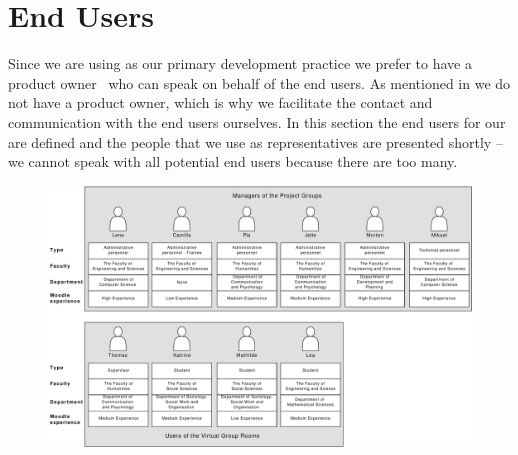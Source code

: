 \section{End Users}
\label{sec:enduser}
Since we are using \scrum{} as our primary development practice we prefer to have a product owner~\cite[p.~115]{Larman04} who can speak on behalf of the end users.
As mentioned in  we do not have a product owner, which is why we facilitate the contact and communication with the end users ourselves.
In this section the end users for our \subsystem{} are defined and the people that we use as representatives are presented shortly -- we cannot speak with all potential end users because there are too many.


\begin{figure}%
\includegraphics[angle=90,scale=0.45]{images/UserGroups2}%
%
\label{fig:usergroup}%
\end{figure}


